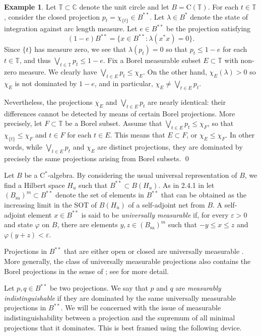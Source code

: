 \documentclass[10pt]{amsart}
\newcommand{\bC}{{\mathbb{C}}}
\newcommand{\bT}{{\mathbb{T}}}
\newcommand{\rC}{\mathrm{C}}
\newcommand{\eps}{\varepsilon}
\renewcommand{\phi}{\varphi}
\theoremstyle{definition}
\newtheorem{example}{Example}
\begin{document}
\begin{example}\label{E:top}
Let $\bT\subset\bC$ denote the unit circle and let $B=\rC(\bT)$. For each $t\in \bT$, consider the closed projection $p_t=\chi_{\{t\}}\in B^{**}$. Let $\lambda\in B^*$ denote the state of integration against arc length measure. 
Let $e\in B^{**}$ be the projection satisfying
\[
 (1-e)B^{**}=\{x\in B^{**}: \lambda(x^*x)=0\}.
\]
Since $\{t\}$ has measure zero, we see that $\lambda(p_t)=0$ so that $p_t\leq 1-e$ for each $t\in \bT$, and thus $\bigvee_{t\in \bT}p_t\leq 1-e$. 
Fix a Borel measurable subset $E\subset \bT$ with non-zero measure. We clearly have $\bigvee_{t\in E}p_t\leq \chi_E$. On the other hand, $\chi_E(\lambda)>0$ so $\chi_E$ is not dominated by $1-e$, and in particular, $\chi_E\neq \bigvee_{t\in E}p_t$.

Nevertheless, the projections $\chi_E$ and $ \bigvee_{t\in E}p_t$ are nearly identical: their differences cannot be detected by means of certain Borel projections. More precisely, let $F\subset \bT$ be a Borel subset.  Assume that $\bigvee_{t\in E}p_t\leq \chi_F$, so that $\chi_{\{t\}}\leq \chi_F$ and $t\in F$ for each $t\in E$. This means that $E\subset F$, or $\chi_E\leq \chi_F$.  In other words, while $\bigvee_{t\in E}p_t$ and $\chi_E$ are distinct projections, they are dominated by precisely the same projections arising from Borel subsets.
\qed
\end{example}


Let $B$ be a 
$\rC^*$-algebra. By considering the usual universal representation of $B$, we find a Hilbert space $H_u$ such that $B^{**}\subset B(H_u)$. 
 As in  2.4.1 in  \cite{pedersen1979book} let $(B_{\text{sa}})^m\subset B^{**}$ denote the set of elements in $B^{**}$ that can be obtained as the increasing limit in the SOT of $B(H_u)$ of a self-adjoint net from $B$. A self-adjoint element $x\in B^{**}$ is said to be \emph{universally measurable} if, for every $\eps>0$ and state $\phi$ on $B$, there are elements $y,z\in(B_{\text{sa}})^m $ such that $-y\leq x\leq z$ and $\phi(y+z)<\eps$.  

Projections in $B^{**}$ that are either open or closed are universally measurable \cite[Proposition 3.11.9]{pedersen1979book}. More generally, the class of universally measurable projections also contains the Borel projections in the sense of \cite{combes1970}; see  \cite{brown2014} for more detail.


Let $p,q\in B^{**}$ be two projections. We say that $p$ and $q$ are \emph{measurably indistinguishable} if they are dominated by the same universally measurable projections in $B^{**}$. We will be concerned with the issue of measurable indistinguishability between a projection and the supremum of all minimal projections that it dominates. This is best framed using the following device.
\end{document}
